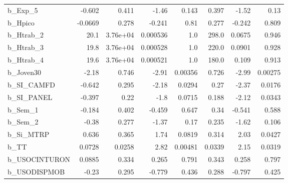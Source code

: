 \begin{tabular}{lrrrrrrr}
b\_Exp\_5       &  -0.602 &    0.411 &     -1.46 &    0.143 &         0.397 &        -1.52 &          0.13 \\
b\_Hpico       & -0.0669 &    0.278 &    -0.241 &     0.81 &         0.277 &       -0.242 &         0.809 \\
b\_Htrab\_2     &    20.1 & 3.76e+04 &  0.000536 &      1.0 &         298.0 &       0.0675 &         0.946 \\
b\_Htrab\_3     &    19.8 & 3.76e+04 &  0.000528 &      1.0 &         220.0 &       0.0901 &         0.928 \\
b\_Htrab\_4     &    19.6 & 3.76e+04 &  0.000521 &      1.0 &         180.0 &        0.109 &         0.913 \\
b\_Joven30     &   -2.18 &    0.746 &     -2.91 &  0.00356 &         0.726 &        -2.99 &       0.00275 \\
b\_SI\_CAMFD    &  -0.642 &    0.295 &     -2.18 &   0.0294 &          0.27 &        -2.37 &        0.0176 \\
b\_SI\_PANEL    &  -0.397 &     0.22 &      -1.8 &   0.0715 &         0.188 &        -2.12 &        0.0343 \\
b\_Sem\_1       &  -0.184 &    0.402 &    -0.459 &    0.647 &          0.34 &       -0.541 &         0.588 \\
b\_Sem\_2       &   -0.38 &    0.277 &     -1.37 &     0.17 &         0.235 &        -1.62 &         0.106 \\
b\_Si\_MTRP     &   0.636 &    0.365 &      1.74 &   0.0819 &         0.314 &         2.03 &        0.0427 \\
b\_TT          &  0.0728 &   0.0258 &      2.82 &  0.00481 &        0.0339 &         2.15 &        0.0319 \\
b\_USOCINTURON &  0.0885 &    0.334 &     0.265 &    0.791 &         0.343 &        0.258 &         0.797 \\
b\_USODISPMOB  &   -0.23 &    0.295 &    -0.779 &    0.436 &         0.288 &       -0.797 &         0.425 \\
\bottomrule
\end{tabular}

